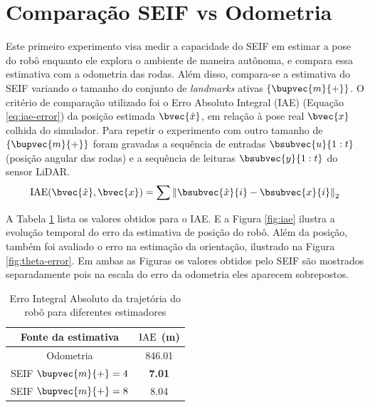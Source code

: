 
\section{Comparação SEIF vs Odometria}

Este primeiro experimento visa medir a capacidade do SEIF em estimar a 
pose do robô enquanto ele explora o ambiente de maneira autônoma, 
e compara essa estimativa 
com a odometria das rodas. Além disso, compara-se a estimativa do SEIF 
variando o tamanho do conjunto de \textit{landmarks} 
ativas $\{\bupvec{m}{+}\}$. O critério de comparação utilizado foi o 
Erro Absoluto Integral (IAE) (Equação \ref{eq:iae-error}) da posição estimada $\bvec{\hat{x}}$, em 
relação à pose real $\bvec{x}$ colhida do simulador. Para repetir o experimento com outro tamanho de $\{\bupvec{m}{+}\}$ foram gravadas a sequência de entradas $\bsubvec{u}{1:t}$ 
(posição angular das rodas) e a sequência de leituras $\bsubvec{y}{1:t}$ 
do sensor LiDAR.
\begin{equation}
  \IAE(\bvec{\hat{x}}, \bvec{x}) = \sum{
    \left\Vert \bsubvec{\hat{x}}{i} - \bsubvec{x}{i} \right\Vert_2
  }
  \label{eq:iae-error}
\end{equation}

A Tabela \ref{table:iae} lista os valores obtidos para o IAE. E a Figura \ref{fig:iae} ilustra a evolução 
temporal do erro da estimativa de posição do robô. Além 
da posição, também foi avaliado o erro na estimação da 
orientação, ilustrado na Figura \ref{fig:theta-error}. Em ambas as 
Figuras os valores obtidos pelo SEIF são mostrados separadamente pois na 
escala do erro da odometria eles aparecem sobrepostos.

\begin{table}[]
\caption{Erro Integral Absoluto da trajetória do robô para diferentes estimadores}
\label{table:iae}
\center
\begin{tabular}{cc}
\hline
Fonte da estimativa & $\operatorname{IAE}$ (m) \\ \hline
Odometria & 846.01 \\
SEIF $\bupvec{m}{+} = 4$ & \textbf{7.01 }\\
SEIF $\bupvec{m}{+} = 8$ & 8.04 \\ \hline
\end{tabular}
\end{table}

